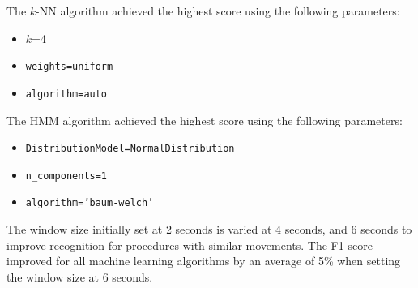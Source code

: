 The $k$-NN algorithm achieved the highest score using the following parameters:
\begin{itemize}
	\item $k$=4
	\item \texttt{weights=uniform}
	\item \texttt{algorithm=auto}
\end{itemize}
The HMM algorithm achieved the highest score using the following parameters:
\begin{itemize}
	\item \texttt{DistributionModel=NormalDistribution}
	\item \texttt{n\_components=1}
	\item \texttt{algorithm='baum-welch'}
\end{itemize}
\par The window size initially set at 2 seconds is varied at 4 seconds, and 6 seconds to improve recognition for procedures with similar movements. The F1 score improved for all machine learning algorithms by an average of 5\% when setting the window size at 6 seconds.
